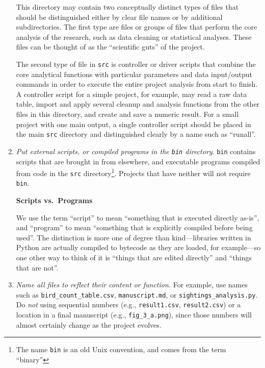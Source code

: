 \documentclass[10pt]{article}
\newcommand{\recommend}[1]{\textit{#1}}
\begin{document}
\begin{enumerate}
    This directory may contain two conceptually distinct types
    of files that should be distinguished either by clear file names or by
    additional subdirectories. The first type are files or
    groups of files that perform the core
    analysis of the research, such as data cleaning or statistical analyses. 
    These files can be thought of as the
    ``scientific guts'' of the project.
    
    The second type of file in \texttt{src} is controller or driver
    scripts that combine the core analytical functions with particular
    parameters and data input/output commands in order to execute the
    entire project analysis from start to finish. A controller script for
    a simple project, for example, may read a raw data table, import and
    apply several cleanup and analysis functions from the other files in
    this directory, and create and save a numeric result. For a small
    project with one main output, a single controller script should be
    placed in the main \texttt{src} directory and distinguished clearly by
    a name such as ``runall''.
    
\item
  \recommend{Put external scripts, or compiled programs
   in the \texttt{bin} directory}.  \texttt{bin} contains
  scripts that are brought in from elsewhere, and executable programs
  compiled from code in the \texttt{src} directory\footnote{The name
    \texttt{bin} is an old Unix convention, and comes from the term
    ``binary''}. Projects that have neither will not require \texttt{bin}.
  
  \begin{framed}
    \noindent \textbf{Scripts vs.\ Programs}

    We use the term ``script'' to mean ``something that is executed
    directly as-is'', and ``program'' to mean ``something that is
    explicitly compiled before being used''.  The distinction is more
    one of degree than kind---libraries written in Python are actually
    compiled to bytecode as they are loaded, for example---so one
    other way to think of it is ``things that are edited directly''
    and ``things that are not''.
  \end{framed}

\item
  \recommend{Name all files to reflect their content or function.} For
  example, use names such as \texttt{bird\_count\_table.csv},
  \texttt{manuscript.md}, or \texttt{sightings\_analysis.py}.  Do
  \emph{not} using sequential numbers (e.g., \texttt{result1.csv},
  \texttt{result2.csv}) or a location in a final manuscript (e.g.,
  \texttt{fig\_3\_a.png}), since those numbers will almost certainly
  change as the project evolves.

\end{enumerate}
\end{document}
